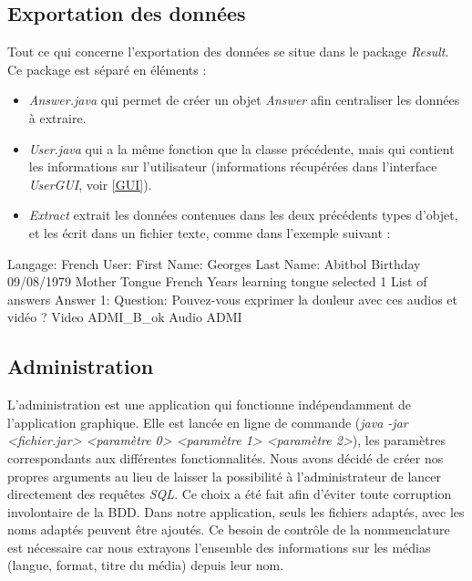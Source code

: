 \subsection{Exportation des données}\label{export}

Tout ce qui concerne l'exportation des données se situe dans le package \textit{Result}. Ce package est séparé en 
 éléments :
 
 \begin{itemize}
  \item \textit{Answer.java} qui permet de créer un objet \textit{Answer} afin centraliser les données à extraire.
  \item \textit{User.java} qui a la même fonction que la classe précédente, mais qui contient les informations sur l'utilisateur (informations récupérées dans l'interface \textit{UserGUI}, voir \ref{GUI}).
  \item \textit{Extract} extrait les données contenues dans les deux précédents types d'objet, et les écrit dans un fichier texte, comme dans l'exemple suivant :
 \end{itemize}
 
 \begin{verbnobox}[\small]
  Langage:   French
  User:
      First Name:   Georges
      Last Name:   Abitbol
      Birthday   09/08/1979
      Mother Tongue   French
      Years learning tongue selected   1
  List of answers
      Answer 1:
	    Question:   Pouvez-vous exprimer la douleur avec ces audios et vidéo ?
	    Video   ADMI_B_ok
	    Audio   ADMI

 \end{verbnobox}
 
 
\subsection{Administration}\label{fonction_admi}

L'administration est une application qui fonctionne indépendamment de l'application graphique.
Elle est lancée en ligne de commande (\textit{java -jar <fichier.jar> <paramètre 0> <paramètre 1> <paramètre 2>}), les paramètres correspondants aux différentes fonctionnalités.
Nous avons décidé de créer nos propres arguments au lieu de laisser la possibilité à l'administrateur de lancer directement des requêtes \textit{SQL}. Ce choix a été fait afin d'éviter toute corruption involontaire de la BDD. Dans notre application, seuls les fichiers adaptés, avec les noms adaptés peuvent être ajoutés.
Ce besoin de contrôle de la nommenclature est nécessaire car nous extrayons l'ensemble des informations sur les médias (langue, format, titre du média) depuis leur nom.


